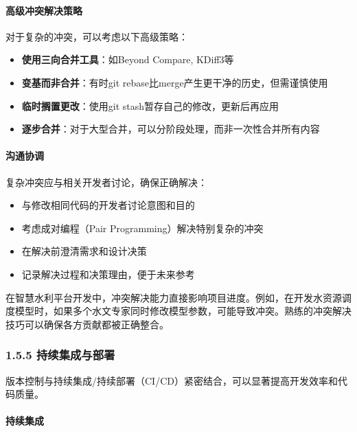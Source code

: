 \paragraph{高级冲突解决策略}\label{ux9ad8ux7ea7ux51b2ux7a81ux89e3ux51b3ux7b56ux7565}

对于复杂的冲突，可以考虑以下高级策略：

\begin{itemize}
\tightlist
\item
  \textbf{使用三向合并工具}：如Beyond Compare, KDiff3等
\item
  \textbf{变基而非合并}：有时git
  rebase比merge产生更干净的历史，但需谨慎使用
\item
  \textbf{临时搁置更改}：使用git stash暂存自己的修改，更新后再应用
\item
  \textbf{逐步合并}：对于大型合并，可以分阶段处理，而非一次性合并所有内容
\end{itemize}

\paragraph{沟通协调}\label{ux6c9fux901aux534fux8c03}

复杂冲突应与相关开发者讨论，确保正确解决：

\begin{itemize}
\tightlist
\item
  与修改相同代码的开发者讨论意图和目的
\item
  考虑成对编程（Pair Programming）解决特别复杂的冲突
\item
  在解决前澄清需求和设计决策
\item
  记录解决过程和决策理由，便于未来参考
\end{itemize}

在智慧水利平台开发中，冲突解决能力直接影响项目进度。例如，在开发水资源调度模型时，如果多个水文专家同时修改模型参数，可能导致冲突。熟练的冲突解决技巧可以确保各方贡献都被正确整合。

\subsubsection{1.5.5
持续集成与部署}\label{ux6301ux7eedux96c6ux6210ux4e0eux90e8ux7f72}

版本控制与持续集成/持续部署（CI/CD）紧密结合，可以显著提高开发效率和代码质量。

\paragraph{持续集成}\label{ux6301ux7eedux96c6ux6210}

